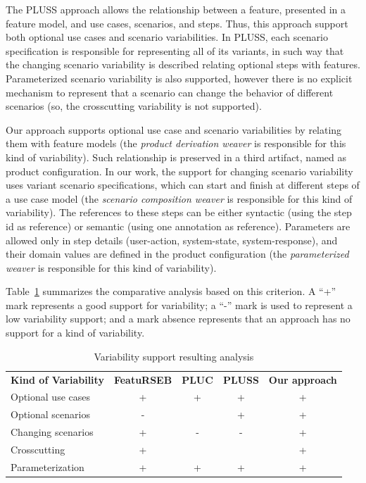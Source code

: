 \documentclass{acm_proc_article-sp}
\begin{document}
The PLUSS approach allows the relationship between a feature,
presented in a feature model, and use cases, scenarios, and steps.
Thus, this approach support both optional use cases and scenario
variabilities. In PLUSS, each scenario specification is responsible
for representing all of its variants, in such way that the changing
scenario variability is described relating optional steps with
features. Parameterized scenario variability is also supported,
however there is no explicit mechanism to represent that a scenario
can change the behavior of different scenarios (so, the
crosscutting variability is not supported).

Our approach supports optional use case and scenario
variabilities by relating them with feature models (the \emph{product derivation 
weaver} is responsible for this kind of variability). Such
relationship is preserved in a third artifact, named as product
configuration. In our work, the support for changing scenario
variability uses variant scenario specifications, which can
start and finish at different steps of a use case model (the \emph{scenario 
composition weaver} is responsible for this kind of variability). The
references to these steps can be either syntactic (using the step id
as reference) or semantic (using one annotation as reference).
Parameters are allowed only in step details (user-action,
system-state, system-response), and their domain
values are defined in the product configuration (the \emph{parameterized weaver} is 
responsible for this kind of variability).

Table~\ref{tab:crt-01} summarizes the comparative analysis based on
this criterion. A ``+'' mark represents a good support for
variability; a ``-'' mark is used to represent a low variability
support; and a mark absence represents that an approach has no
support for a kind of variability.


\begin{table}[h]
\begin{center}
\caption{Variability support resulting analysis} \label{tab:crt-01}
\begin{tabular}{lcccc}
   \hline\noalign{\smallskip}
  {\bf Kind of Variability} & {\bf FeatuRSEB} & {\bf PLUC} & {\bf PLUSS} & {\bf Our approach} \\
   \noalign{\smallskip}
   \hline
   \noalign{\smallskip}
    Optional use cases    & +     & +     & +     & + \\ 
    Optional scenarios    & -     &       & +     & + \\ 
    Changing scenarios    & +     & -     & -     & + \\ 
    Crosscutting          & +     &       &       & + \\ 
    Parameterization      & +     & +     & +     & + \\ \hline
\end{tabular}
\end{center}
\end{table}
\end{document}
